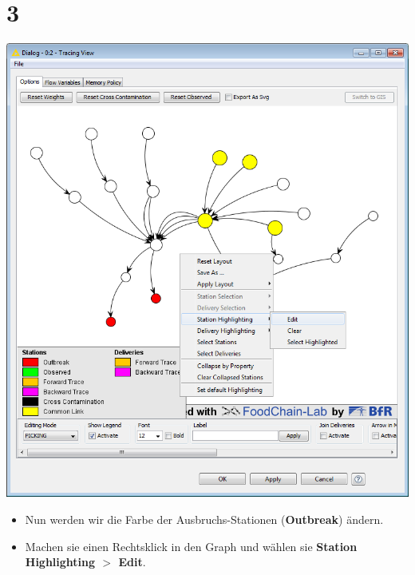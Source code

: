 \documentclass{beamer}
\begin{document}
\section{3}
\begin{frame}
	\begin{center}
  		\includegraphics[height=0.6\textheight]{3.png}
	\end{center}
	\begin{itemize}
		\item Nun werden wir die Farbe der Ausbruchs-Stationen (\textbf{Outbreak}) ändern.
		\item Machen sie einen Rechtsklick in den Graph und wählen sie \textbf{Station Highlighting $>$ Edit}.
	\end{itemize}
\end{frame}
\end{document}
